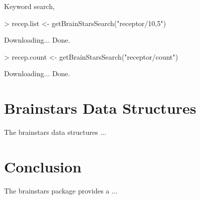 \documentclass[12pt,fullpage]{article}
\begin{document}
Keyword search,
\begin{Schunk}
\begin{Sinput}
> recep.list <- getBrainStarsSearch("receptor/10,5")
\end{Sinput}
\begin{Soutput}
Downloading...
Done.
\end{Soutput}
\begin{Sinput}
> recep.count <- getBrainStarsSearch("receptor/count")
\end{Sinput}
\begin{Soutput}
Downloading...
Done.
\end{Soutput}
\end{Schunk}

\section{Brainstars Data Structures}
The brainstars data structures ...

\section{Conclusion}
The brainstars package provides a ...
\end{document}
